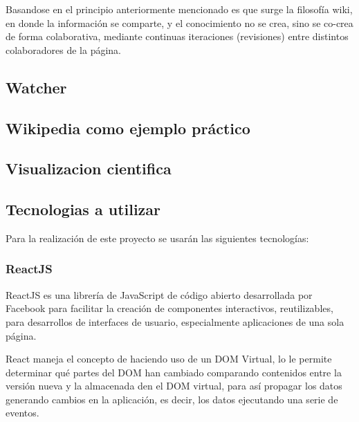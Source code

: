         Basandose en el principio anteriormente mencionado es que surge la filosofía wiki, en donde la información se comparte, y el conocimiento no se crea, sino se co-crea de forma colaborativa, mediante continuas iteraciones (revisiones) entre distintos colaboradores de la página.

    \subsection{Watcher}

    \subsection{Wikipedia como ejemplo práctico}

    \subsection{Visualizacion cientifica}


\subsection{Tecnologias a utilizar}

    Para la realización de este proyecto se usarán las siguientes tecnologías:

    \subsubsection{ReactJS}

        ReactJS es una librería de JavaScript de código abierto desarrollada por Facebook para facilitar la creación de componentes interactivos, reutilizables, para desarrollos de interfaces de usuario, especialmente aplicaciones de una sola página.

        React maneja el concepto de  haciendo uso de un DOM Virtual, lo le permite determinar qué partes del DOM han cambiado comparando contenidos entre la versión nueva y la almacenada den el DOM virtual, para así propagar los datos generando cambios en la aplicación, es decir, los datos  ejecutando una serie de eventos.

        \iffalse 
            \begin{figure}
                \texttt{[image: virtual\_dom]}
                \caption{Propagación de datos usando el Virtual DOM}
            \end{figure}
        \fi

